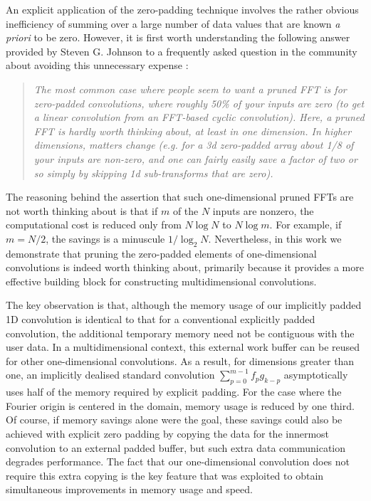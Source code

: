 \documentclass[final]{siamltex}
\begin{document}
An explicit application of the zero-padding technique involves the rather
obvious inefficiency of summing over a large number of data values that
are known {\it a priori\/} to be zero.
However, it is first worth understanding the following answer 
provided by Steven G. Johnson to a frequently asked question in the
community about avoiding this unnecessary
expense \cite{http://www.fftw.org/pruned.html}:
\begin{quotation}\label{quote}
{\it
The most common case where people seem to want a pruned FFT is for
zero-padded convolutions, where roughly 50\% of your inputs are zero (to
get a linear convolution from an FFT-based cyclic convolution). Here, a
pruned FFT is hardly worth thinking about, at least in one dimension. In
higher dimensions, matters change (e.g. for a 3d zero-padded array about
1/8 of your inputs are non-zero, and one can fairly easily save a factor of
two or so simply by skipping 1d sub-transforms that are zero).
}
\end{quotation}

The reasoning behind the assertion that such one-dimensional pruned FFTs
are not worth thinking about is that if $m$ of the $N$ inputs are nonzero,
the computational cost is reduced only from $N\log N$ to $N\log m$.
For example, if $m=N/2$, the savings is a minuscule $1/\log_2 N$.
Nevertheless, in this work we demonstrate that pruning the zero-padded
elements of one-dimensional convolutions is indeed worth thinking about,
primarily because it provides a more effective building block for constructing
multidimensional convolutions.

The key observation is that, although the memory usage of our implicitly
padded 1D convolution is identical to that for a conventional explicitly
padded convolution, the additional temporary memory need not be contiguous
with the user data.  In a multidimensional context, this external work
buffer can be reused for other one-dimensional convolutions.
As a result, for dimensions greater than one,
an implicitly dealised standard convolution $\sum_{p=0}^{m-1} f_p g_{k-p}$
asymptotically uses half of the
memory required by explicit padding. For the case where the Fourier origin is
centered in the domain, memory usage is reduced by one third.
Of course, if memory savings alone were the goal, these savings could
also be achieved with explicit zero padding by copying the data for the
innermost convolution to an external padded buffer, but such extra data
communication degrades performance. The fact that our
one-dimensional convolution does not require this extra copying is the key
feature that was exploited to obtain simultaneous improvements in memory
usage and speed.
\end{document}
